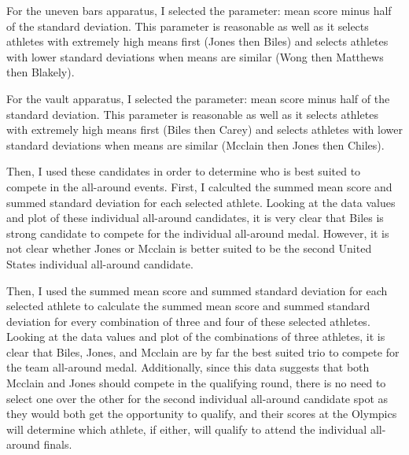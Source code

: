\documentclass[12pt]{article}
\begin{document}
For the uneven bars apparatus, I selected the parameter: mean score minus half of the standard deviation. 
This parameter is reasonable as well as it selects athletes with extremely high means first (Jones then Biles) and selects 
athletes with lower standard deviations when means are similar (Wong then Matthews then Blakely). 

For the vault apparatus, I selected the parameter: mean score minus half of the standard deviation. 
This parameter is reasonable as well as it selects athletes with extremely high means first (Biles then Carey) and selects 
athletes with lower standard deviations when means are similar (Mcclain then Jones then Chiles). 

Then, I used these candidates in order to determine who is best suited to compete in the all-around events. 
First, I calculted the summed mean score and summed standard deviation for each selected athlete. Looking at the data 
values and plot of these individual all-around candidates, it is very clear that Biles is strong candidate to 
compete for the individual all-around medal. However, it is not clear whether Jones or Mcclain is better suited 
to be the second United States individual all-around candidate.

Then, I used the summed mean score and summed standard deviation for each selected athlete to calculate the 
summed mean score and summed standard deviation for every combination of 
three and four of these selected athletes. Looking at the data values and plot of the combinations of three athletes, 
it is clear that Biles, Jones, and Mcclain are by far the best suited trio to compete for the team all-around medal. 
Additionally, since this data suggests that both Mcclain and Jones should compete in the qualifying round, there 
is no need to select one over the other for the second individual all-around candidate spot as they would both get 
the opportunity to qualify, and their scores at the Olympics will determine which athlete, if either, will qualify 
to attend the individual all-around finals. 
\end{document}
